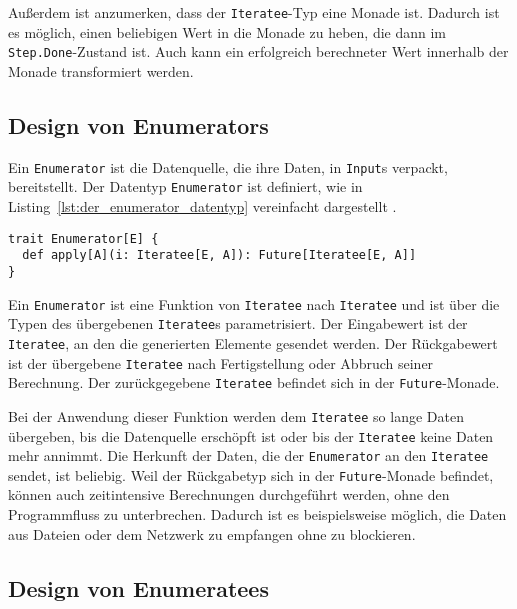 Außerdem ist anzumerken, dass der \lstinline|Iteratee|-Typ eine Monade ist.
Dadurch ist es möglich, einen beliebigen Wert in die Monade zu heben, die dann im \lstinline|Step.Done|-Zustand ist.
Auch kann ein erfolgreich berechneter Wert innerhalb der Monade transformiert werden.



\subsection{Design von Enumerators} %
\label{sub:design_enumerators}

Ein \lstinline|Enumerator| ist die Datenquelle, die ihre Daten, in \lstinline|Input|s verpackt, bereitstellt.
Der Datentyp \lstinline|Enumerator| ist definiert, wie in Listing~\ref{lst:der_enumerator_datentyp} vereinfacht dargestellt \cite[vgl.][]{play_enumerator_source_code}.
\begin{lstlisting}[caption=Der Enumerator-Datentyp, label=lst:der_enumerator_datentyp]
trait Enumerator[E] {
  def apply[A](i: Iteratee[E, A]): Future[Iteratee[E, A]]
}
\end{lstlisting}

Ein \lstinline|Enumerator| ist eine Funktion von \lstinline|Iteratee| nach \lstinline|Iteratee| und ist über die Typen des übergebenen \lstinline|Iteratee|s parametrisiert.
Der Eingabewert ist der \lstinline|Iteratee|, an den die generierten Elemente gesendet werden.
Der Rückgabewert ist der übergebene \lstinline|Iteratee| nach Fertigstellung oder Abbruch seiner Berechnung.
Der zurückgegebene \lstinline|Iteratee| befindet sich in der \lstinline|Future|-Monade.

Bei der Anwendung dieser Funktion werden dem \lstinline|Iteratee| so lange Daten übergeben, bis die Datenquelle erschöpft ist oder bis der \lstinline|Iteratee| keine Daten mehr annimmt.
Die Herkunft der Daten, die der \lstinline|Enumerator| an den \lstinline|Iteratee| sendet, ist beliebig.
Weil der Rückgabetyp sich in der \lstinline|Future|-Monade befindet, können auch zeitintensive Berechnungen durchgeführt werden, ohne den Programmfluss zu unterbrechen.
Dadurch ist es beispielsweise möglich, die Daten aus Dateien oder dem Netzwerk zu empfangen ohne zu blockieren.



\subsection{Design von Enumeratees} %
\label{sub:design_enumeratees}

